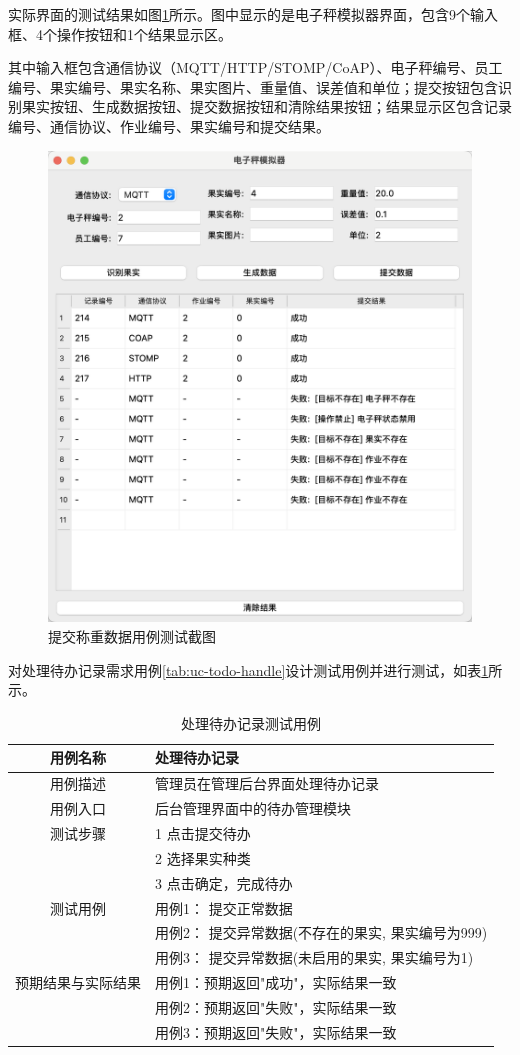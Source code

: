 实际界面的测试结果如图\ref{fig:weigh-submit-result}所示。图中显示的是电子秤模拟器界面，包含9个输入框、4个操作按钮和1个结果显示区。

其中输入框包含通信协议（MQTT/HTTP/STOMP/CoAP）、电子秤编号、员工编号、果实编号、果实名称、果实图片、重量值、误差值和单位；提交按钮包含识别果实按钮、生成数据按钮、提交数据按钮和清除结果按钮；结果显示区包含记录编号、通信协议、作业编号、果实编号和提交结果。

\begin{figure}[H]
    \centering
    \includegraphics[width=0.8\linewidth]{../result/weigh-submit-result.png}
    \caption{提交称重数据用例测试截图}
    \label{fig:weigh-submit-result}
\end{figure}

对处理待办记录需求用例\ref{tab:uc-todo-handle}设计测试用例并进行测试，如表\ref{tab:uc-todo-handle-test}所示。

\begin{longtable}[ht]{|c|p{8cm}|}
\caption{处理待办记录测试用例}
\label{tab:uc-todo-handle-test}
\\
\hline
用例名称 & 处理待办记录 \\
\hline
用例描述 & 管理员在管理后台界面处理待办记录 \\
\hline
用例入口 & 后台管理界面中的待办管理模块 \\
\hline
测试步骤 & 1 点击提交待办 \\
& 2 选择果实种类 \\
& 3 点击确定，完成待办 \\
\hline
测试用例 & 用例1： 提交正常数据 \\
& 用例2： 提交异常数据(不存在的果实, 果实编号为999) \\
& 用例3： 提交异常数据(未启用的果实, 果实编号为1) \\
\hline
预期结果与实际结果 & 用例1：预期返回"成功"，实际结果一致 \\
& 用例2：预期返回"失败"，实际结果一致 \\
& 用例3：预期返回"失败"，实际结果一致 \\
\hline
\end{longtable}

